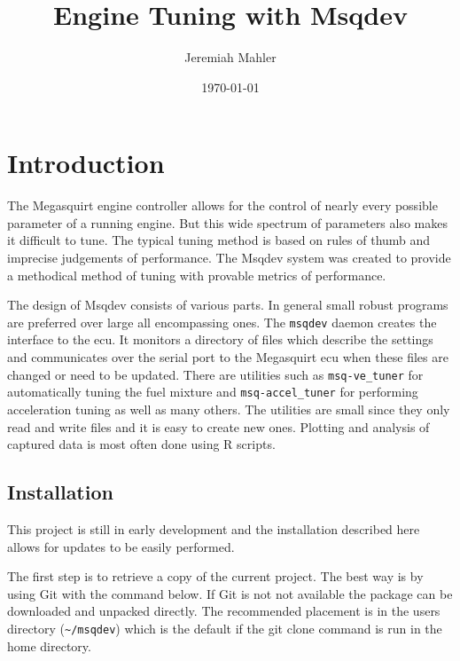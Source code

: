 \documentclass{article}
\begin{document}
\setlength{\parindent}{1cm}

\title{Engine Tuning with Msqdev}
\author{Jeremiah Mahler}
\date{\today}

\maketitle

\tableofcontents

\pagebreak

\section{Introduction}

The Megasquirt \cite{MEGA11} engine controller allows for the
control of nearly every possible parameter of a running engine.
But this wide spectrum of parameters also makes it difficult to tune.
The typical tuning method \cite{MEGAMAN} is based on rules of thumb
and imprecise judgements of performance.
The Msqdev system \cite{MAHL11} was created to provide a
methodical method of tuning with provable metrics of performance.

The design of Msqdev consists of various parts.
In general small robust programs are preferred over large all encompassing ones.
The \verb+msqdev+ daemon creates the interface to the ecu.
It monitors a directory of files which describe the settings and
communicates over the serial port to the Megasquirt ecu when these
files are changed or need to be updated.
There are utilities such as \verb+msq-ve_tuner+ for automatically
tuning the fuel mixture and \verb+msq-accel_tuner+ for performing
acceleration tuning as well as many others.
The utilities are small since they only read and write files and it
is easy to create new ones.
Plotting and analysis of captured data is most often done using
R \cite{R} scripts.

\subsection{Installation}

This project is still in early development and the installation
described here allows for updates to be easily performed.

The first step is to retrieve a copy of the current project.
The best way is by using Git \cite{GIT} with the command below.
If Git is not not available the package can be downloaded and unpacked
directly.
The recommended placement is in the users directory (\verb+~/msqdev+)
which is the default if the git clone command is run in the home directory.
\end{document}
